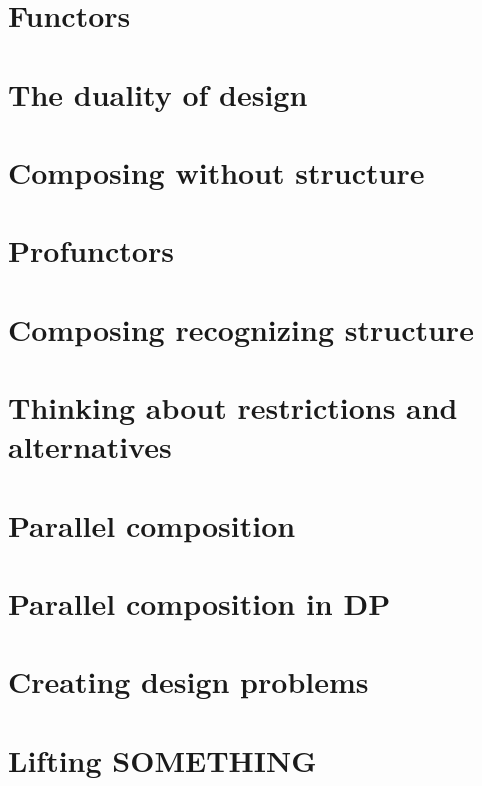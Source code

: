 \documentclass[paper=6in:9in,pagesize=pdftex,
 headinclude=off,footinclude=on,11pt,twoside]{scrbook}
\begin{document}
\chapter{Functors}

\clearpage
\chapter{The duality of design}

\clearpage
\chapter{Composing without structure}

\clearpage
\chapter{Profunctors}
\clearpage
\chapter{Composing recognizing structure}

\clearpage
\chapter{Thinking about restrictions and alternatives}

\clearpage
\chapter{Parallel composition}

\clearpage
\chapter{Parallel composition in DP}

\clearpage
\chapter{Creating design problems}

\clearpage
\chapter{Lifting SOMETHING}

\clearpage
\end{document}
